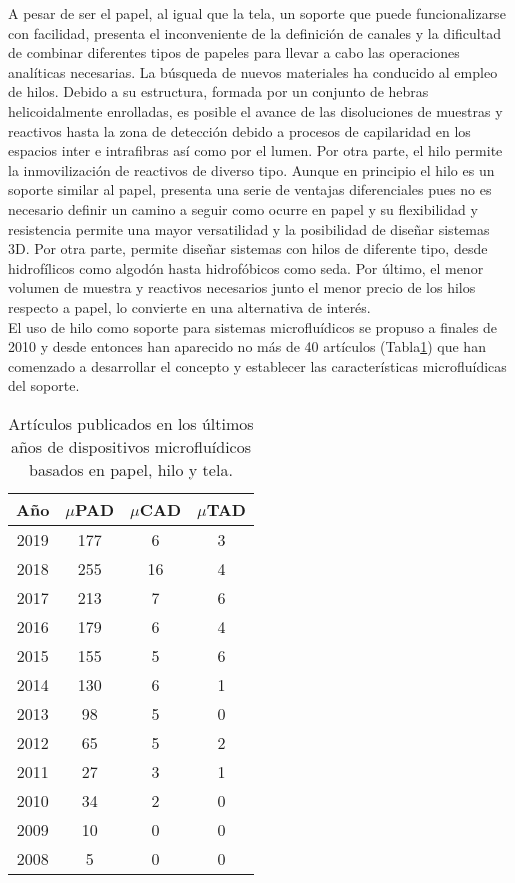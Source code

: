 \documentclass{article}
\begin{document}
A pesar de ser el papel, al igual que la tela, un soporte que puede funcionalizarse con facilidad, presenta el inconveniente de la definición de canales y la dificultad de combinar diferentes tipos de papeles para llevar a cabo las operaciones analíticas necesarias. La búsqueda de nuevos materiales ha conducido al empleo de hilos. Debido a su estructura, formada por un conjunto de hebras helicoidalmente enrolladas, es posible el avance de las disoluciones de muestras y reactivos hasta la zona de detección debido a procesos de capilaridad en los espacios inter e intrafibras así como por el lumen\cite{Banerjee2013}. Por otra parte, el hilo permite la inmovilización de reactivos de diverso tipo\cite{Lu2015}. Aunque en principio el hilo es un soporte similar al papel, presenta una serie de ventajas diferenciales\cite{Nilghaz2013} pues no es necesario definir un camino a seguir como ocurre en papel y su flexibilidad y resistencia permite una mayor versatilidad y la posibilidad de diseñar sistemas 3D. Por otra parte, permite diseñar sistemas con hilos de diferente tipo, desde hidrofílicos como algodón hasta hidrofóbicos como seda. Por último, el menor volumen de muestra y reactivos necesarios junto el menor precio de los hilos respecto a papel, lo convierte en una alternativa de interés.\\

El uso de hilo como soporte para sistemas microfluídicos se propuso a finales de 2010\cite{Li2010} y desde entonces han aparecido no más de 40 artículos (Tabla\ref{tabla:biblio}) que han comenzado a desarrollar el concepto y establecer las características microfluídicas del soporte\cite{Ballerini2011}.
\begin{table}
	\centering
	\caption{Artículos publicados en los últimos años de dispositivos microfluídicos basados en papel, hilo y tela.}
	\label{tabla:biblio}
	
\begin{tabular}{|c|c|c|c|}
	\hline 
	Año & $\mu$PAD & $\mu$CAD & $\mu$TAD \\ 
	\hline 
	2019 & 177 & 6 & 3 \\ 
	\hline 
	2018 & 255 & 16 & 4 \\ 
	\hline 
	2017 & 213 & 7 & 6 \\ 
	\hline 
	2016 & 179 & 6 & 4 \\ 
	\hline 
	2015 & 155 & 5 & 6 \\ 
	\hline 
	2014 & 130 & 6 & 1 \\ 
	\hline 
	2013 & 98 & 5 & 0 \\ 
	\hline 
	2012 & 65 & 5 & 2 \\ 
	\hline 
	2011 & 27 & 3 & 1 \\ 
	\hline 
	2010 & 34 & 2 & 0 \\ 
	\hline 
	2009 & 10 & 0 & 0 \\ 
	\hline 
	2008 & 5 & 0 & 0 \\ 
	\hline 
\end{tabular} 
\end{table}
\end{document}

